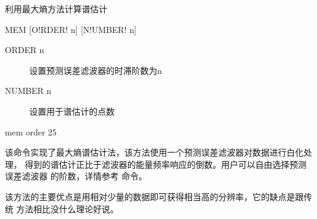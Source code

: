 \label{spe:mem}

利用最大熵方法计算谱估计

\begin{SACSTX}
MEM [O!RDER! n] [N!UMBER! n]
\end{SACSTX}

\begin{description}
\item [ORDER n] 设置预测误差滤波器的时滞阶数为n
\item [NUMBER n] 设置用于谱估计的点数
\end{description}

\begin{SACDFT}
mem order 25
\end{SACDFT}

该命令实现了最大熵谱估计法，该方法使用一个预测误差滤波器对数据进行白化处理，
得到的谱估计正比于滤波器的能量频率响应的倒数。用户可以自由选择预测误差滤波器
的阶数，详情参考  命令。

该方法的主要优点是用相对少量的数据即可获得相当高的分辨率，它的缺点是跟传统
方法相比没什么理论好说。
